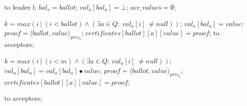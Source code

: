 \begin{algorithm}
\begin{algorithmic}[1]
		\State
		\State {} to leader l;
		\State $bal_a = ballot$;	
		\State $val_a[bal_a] = \bot$;	
		\State $acc\_values = \emptyset$;		
		\EndIf
		\EndFunction
	
		\State
		\State $k = max(i\ |\ (i < ballot) \wedge (\exists a \in Q :\ val_a[i]\ \neq null))$;
		\State $val_a[bal_a] = value$;
		\State $proof = \langle ballot, value \rangle_{priv_a}$;
		\State $certificates[ballot][a][value] = proof$;
		\State {} to acceptors;
		\EndIf
		\EndFunction
		
		\State
		\State $k = max(i\ |\ (i < m) \wedge (\exists a \in Q :\ val_a[i]\ \neq null))$;
		\State $val_a[bal_a] =  val_a[bal_a] \bullet value$;
		\State $proof = \langle ballot, value \rangle_{priv_a}$;
		\State $certificates[ballot][a][value] = proof$;

		\State {} to acceptors;
		\EndIf
		\EndFunction
	\end{algorithmic}
\end{algorithm}

